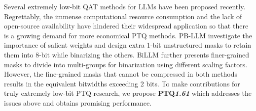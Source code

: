 Several extremely low-bit QAT methods for LLMs \citep{xu2024onebit,wang2023bitnet,ma2024era} have been proposed recently. Regrettably, the immense computational resource consumption and the lack of open-source availability have hindered their widespread application so that there is a growing demand for more economical PTQ methods. PB-LLM \citep{shang2023pb} investigate the importance of salient weights and design extra 1-bit unstructured masks to retain them into 8-bit while binarizing the others. BiLLM \citep{huang2024billm} further presents finer-grained masks to divide into multi-groups for binarization using different scaling factors. However, the fine-grained masks that cannot be compressed in both methods results in the equivalent bitwidths exceeding 2 bits. To make contributions for truly extremely low-bit PTQ research, we propose \textbf{PTQ\textit{1.61}} which addresses the issues above and obtains promising performance.